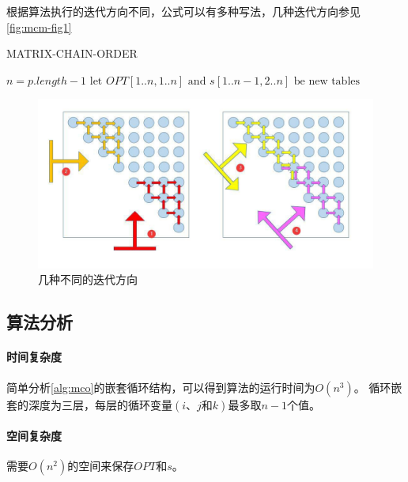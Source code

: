\begin{remark}
	根据算法执行的迭代方向不同，公式可以有多种写法，几种迭代方向参见\autoref{fig:mcm-fig1}
\end{remark}

\begin{algorithm}
	\caption{MATRIX-CHAIN-ORDER}\label{alg:mco}
	\BlankLine{}
	$n = p.length-1$\;
	$\text{let } OPT[1..n, 1..n] \text{ and } s[1..n-1, 2..n] \text{ be new tables}$\;
\end{algorithm}

\begin{figure}[hbt!]
	\centering
	\includegraphics[scale=0.6]{image/dynamic-programming-1.png}
	\caption{几种不同的迭代方向}\label{fig:mcm-fig1}
\end{figure}

\subsection{算法分析}
\paragraph*{时间复杂度}
简单分析\autoref{alg:mco}的嵌套循环结构，可以得到算法的运行时间为$O(n^3)$。
循环嵌套的深度为三层，每层的循环变量$(i\text{、}j\text{和}k)$最多取$n-1$个值。
\paragraph*{空间复杂度}
需要$O(n^2)$的空间来保存$OPT$和$s$。
